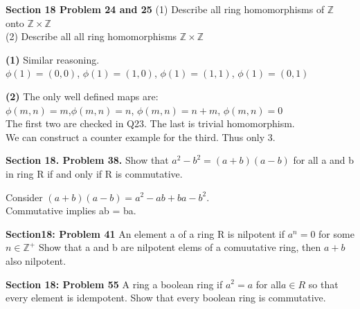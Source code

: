 \documentclass{article}
\newcommand\Z{\ensuremath{\mathbb{Z}}}
\begin{document}
\begin{Problem}
\textbf{Section 18 Problem 24 and 25}
    (1) Describe all ring homomorphisms of $\Z$ onto $\Z \times \Z$
    \\(2) Describe all  all ring homomorphisms $\Z \times \Z$
\end{Problem}

\begin{Solution}
    \textbf{(1) }Similar reasoning. 
    \\$\phi(1) = (0,0)$, $\phi(1) = (1,0)$, $\phi(1) = (1,1)$, $\phi(1) = (0,1)$

    \textbf{(2)} The only well defined maps are:
    \\$\phi(m,n) = m$,$\phi(m,n) = n$, $\phi(m,n) = n+m$, $\phi(m,n) = 0$
    \\ The first two are checked in Q23. The last is trivial homomorphism. 
    \\ We can construct a counter example for the third. Thus only 3. 
\end{Solution}
\begin{Problem}
    \textbf{Section 18. Problem 38.}
    Show that $a^2 - b^2 = (a+b)(a-b)$ for all a and b in ring R if and only if R is commutative. 
\end{Problem}

\begin{Solution}
Consider $(a+b)(a-b) = a^2 -ab + ba -b^2.$ 
\\Commutative implies ab = ba.
\end{Solution}

\begin{Problem}
\textbf{Section18: Problem 41}
    An element a of a ring R is nilpotent if $a^n = 0 $ for some $n \in \Z^+$ Show that a and b are nilpotent elems of a comuutative ring, then $a+b $ also nilpotent.
\end{Problem}

\begin{Solution}
    
\end{Solution}


\begin{Problem}
    \textbf{Section 18: Problem 55}
    A ring a boolean ring if $a^2 = a$ for all$ a \in R$ so that every element is idempotent. Show that every boolean ring is commutative. 
\end{Problem}



\begin{Solution}
    
\end{Solution}
\end{document}
